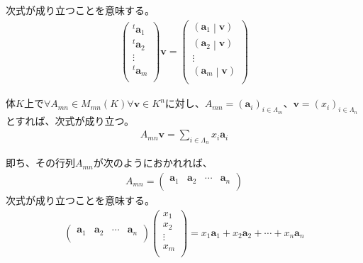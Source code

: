 \documentclass[dvipdfmx]{jsarticle}
\begin{document}
次式が成り立つことを意味する。
\begin{align*}
\begin{pmatrix}
^{t}\mathbf{a}_{1} \\
^{t}\mathbf{a}_{2} \\
 \vdots \\
{^{t}\mathbf{a}}_{m} \\
\end{pmatrix}\mathbf{v} = \begin{pmatrix}
\left( \mathbf{a}_{1} \middle| \mathbf{v} \right) \\
\left( \mathbf{a}_{2} \middle| \mathbf{v} \right) \\
 \vdots \\
\left( \mathbf{a}_{m} \middle| \mathbf{v} \right) \\
\end{pmatrix}
\end{align*}
\begin{thm}\label{2.1.4.5}
体$K$上で$\forall A_{mn} \in M_{mn}(K)\forall\mathbf{v} \in K^{n}$に対し、$A_{mn} = \left( \mathbf{a}_{i} \right)_{i \in \varLambda_{m}}$、$\mathbf{v} = \left( x_{i} \right)_{i \in \varLambda_{n}}$とすれば、次式が成り立つ。
\begin{align*}
A_{mn}\mathbf{v} = \sum_{i \in \varLambda_{n}} {x_{i}\mathbf{a}_{i}}
\end{align*}
\end{thm}\par
即ち、その行列$A_{mn}$が次のようにおかれれば、
\begin{align*}
A_{mn} = \begin{pmatrix}
\mathbf{a}_{1} & \mathbf{a}_{2} & \cdots & \mathbf{a}_{n} \\
\end{pmatrix}
\end{align*}
次式が成り立つことを意味する。
\begin{align*}
\begin{pmatrix}
\mathbf{a}_{1} & \mathbf{a}_{2} & \cdots & \mathbf{a}_{n} \\
\end{pmatrix}\begin{pmatrix}
x_{1} \\
x_{2} \\
 \vdots \\
x_{m} \\
\end{pmatrix} = x_{1}\mathbf{a}_{1} + x_{2}\mathbf{a}_{2} + \cdots + x_{n}\mathbf{a}_{n}
\end{align*}
\end{document}
